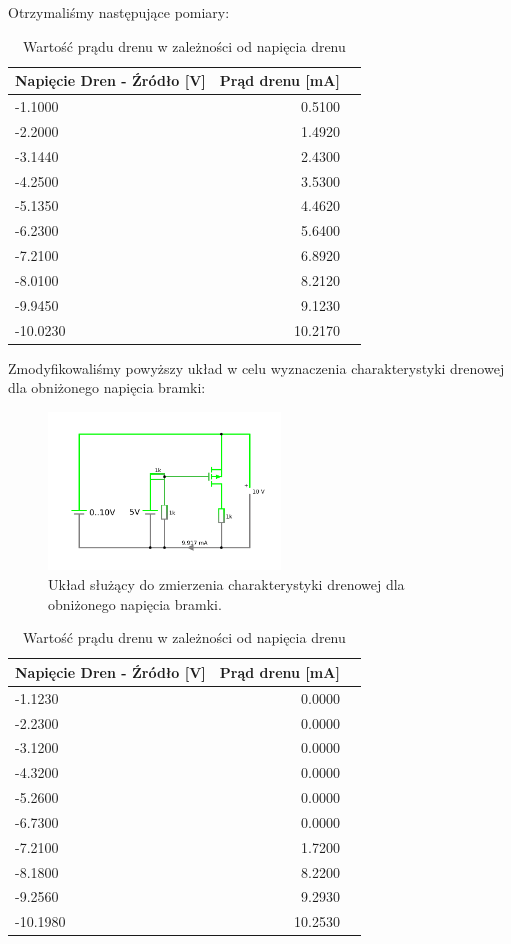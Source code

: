 \documentclass[polish,polish,a4paper]{article}
\begin{document}
Otrzymaliśmy następujące pomiary:

\begin{table}[H]\centering
\caption{Wartość prądu drenu w zależności od napięcia drenu}\label{tab: }
\begin{tabular}{lrr}\toprule
Napięcie Dren - Źródło [V] &Prąd drenu [mA] \\\midrule
-1.1000 &0.5100 \\
-2.2000 &1.4920 \\
-3.1440 &2.4300 \\
-4.2500 &3.5300 \\
-5.1350 &4.4620 \\
-6.2300 &5.6400 \\
-7.2100 &6.8920 \\
-8.0100 &8.2120 \\
-9.9450 &9.1230 \\
-10.0230 &10.2170 \\

\bottomrule
\end{tabular}
\end{table}


Zmodyfikowaliśmy powyższy układ w celu wyznaczenia charakterystyki drenowej dla obniżonego napięcia bramki:
\begin{figure}[H]
\centering
\includegraphics[width=0.55\textwidth]{pmos drenowa obnizona.pdf}
\caption{Układ służący do zmierzenia charakterystyki drenowej dla obniżonego napięcia bramki.}
\end{figure}

\begin{table}[H]\centering
\caption{Wartość prądu drenu w zależności od napięcia drenu}\label{tab: }
\begin{tabular}{lrr}\toprule
Napięcie Dren - Źródło [V] &Prąd drenu [mA] \\\midrule
-1.1230 & 0.0000 \\
-2.2300 & 0.0000 \\
-3.1200 & 0.0000 \\
-4.3200 & 0.0000 \\
-5.2600 & 0.0000 \\
-6.7300 & 0.0000 \\
-7.2100 & 1.7200 \\
-8.1800 & 8.2200 \\
-9.2560 & 9.2930 \\
-10.1980 & 10.2530 \\

\bottomrule
\end{tabular}
\end{table}
\end{document}
